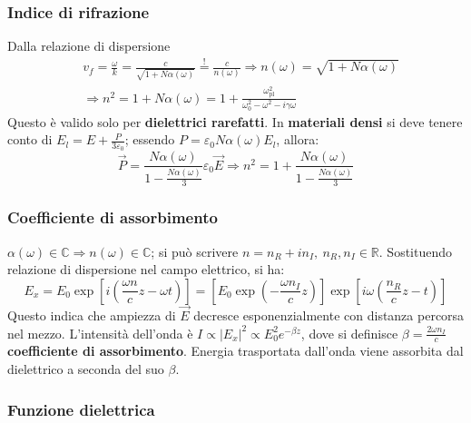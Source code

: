 \documentclass[10pt, a4paper]{scrartcl}
\numberwithin{equation}{subsection}
\theoremstyle{style1}
\begin{document}
\subsubsection{Indice di rifrazione}
Dalla relazione di dispersione
\begin{equation}
	\begin{split}
		&v_f = \frac{\omega}{k} = \frac{c}{\sqrt{1+N\alpha (\omega)} } \stackrel{!}{=} \frac{c}{n(\omega)}\Rightarrow n(\omega) = \sqrt{1+ N\alpha (\omega)} \\
		&\Rightarrow n^2 = 1+N\alpha (\omega) = 1 + \frac{\omega_\text{pl}^2}{\omega_0^2 - \omega^2 - i\gamma\omega}
	\end{split}
\end{equation}
Questo \`e valido solo per \textbf{dielettrici rarefatti}. In \textbf{materiali densi} si deve tenere conto di $E_l = E + \frac{P}{3\varepsilon _0}$; essendo $ P = \varepsilon _0 N \alpha (\omega) E_l$, allora:
\begin{equation}
	\vec{P}=\frac{N\alpha (\omega)}{1- \frac{N\alpha (\omega)}{3}}\varepsilon _0 \vec{E}\Rightarrow n^2 = 1+ \frac{N\alpha (\omega)}{1-\frac{N\alpha (\omega)}{3}}
\end{equation}
\subsubsection{Coefficiente di assorbimento}
$\alpha (\omega) \in \mathbb{C}\Rightarrow n(\omega)\in \mathbb{C}$; si pu\`o scrivere $n = n_R + i n_I , \ n_R, n_I \in \mathbb{R}$. Sostituendo relazione di dispersione nel campo elettrico, si ha:
\begin{equation}
	E_x = E_0 \exp \left[ i\left(\frac{\omega n}{c}z - \omega t\right)  \right]  = \left[ E_0 \exp \left(- \frac{\omega n_I}{c}z\right)   \right] \exp\left[ i\omega \left(\frac{n_R}{c}z - t\right)  \right]  
\end{equation}
Questo indica che ampiezza di $\vec{E}$ decresce esponenzialmente con distanza percorsa nel mezzo. L'intensit\`a dell'onda \`e $I \propto \left\lvert E_x \right\rvert ^2 \propto E_0^2 e^{- \beta z} $, dove si definisce $\beta  = \frac{2\omega n_I}{c}$ \textbf{coefficiente di assorbimento}. Energia trasportata dall'onda viene assorbita dal dielettrico a seconda del suo $\beta $.
\subsubsection{Funzione dielettrica}
\end{document}
